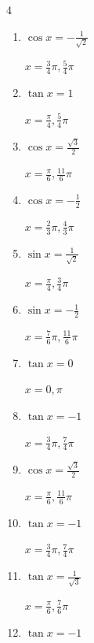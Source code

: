 \begin{multicols}{4}
\begin{enumerate}
  \item $\displaystyle \cos{x}  = -\frac{1}{\sqrt{2}}$

        $\displaystyle x = \frac{3}{4}\pi , \frac{5}{4}\pi$

  \item $\displaystyle \tan{x}  = 1$

        $\displaystyle x = \frac{\pi}{4} , \frac{5}{4}\pi$

  \item $\displaystyle \cos{x}  = \frac{\sqrt{3}}{2}$

        $\displaystyle x = \frac{\pi}{6} , \frac{11}{6}\pi$

  \item $\displaystyle \cos{x}  = -\frac{1}{2}$

        $\displaystyle x = \frac{2}{3}\pi , \frac{4}{3}\pi$

  \item $\displaystyle \sin{x}  = \frac{1}{\sqrt{2}}$

        $\displaystyle x = \frac{\pi}{4} , \frac{3}{4}\pi$

  \item $\displaystyle \sin{x}  = -\frac{1}{2}$

        $\displaystyle x = \frac{7}{6}\pi , \frac{11}{6}\pi$

  \item $\displaystyle \tan{x}  = 0$

        $\displaystyle x = 0 , \pi$

  \item $\displaystyle \tan{x}  = -1$

        $\displaystyle x = \frac{3}{4}\pi , \frac{7}{4}\pi$

  \item $\displaystyle \cos{x}  = \frac{\sqrt{3}}{2}$

        $\displaystyle x = \frac{\pi}{6} , \frac{11}{6}\pi$

  \item $\displaystyle \tan{x}  = -1$

        $\displaystyle x = \frac{3}{4}\pi , \frac{7}{4}\pi$

\columnbreak %

  \item $\displaystyle \tan{x}  = \frac{1}{\sqrt{3}}$

        $\displaystyle x = \frac{\pi}{6} , \frac{7}{6}\pi$

  \item $\displaystyle \tan{x}  = -1$


\end{enumerate}
\end{multicols}
